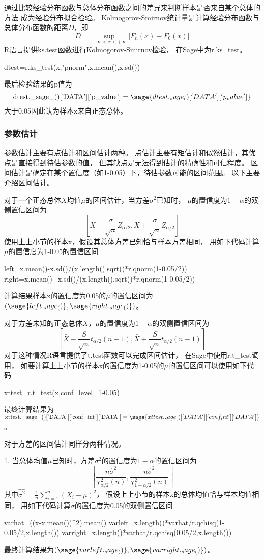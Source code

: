 通过比较经验分布函数与总体分布函数之间的差异来判断样本是否来自某个总体的方法
成为经验分布拟合检验。
Kolmogorov-Smirnov统计量是计算经验分布函数与总体分布函数的距离$D$，即
\[D=\sup_{-\infty<x<+\infty} \left| F_n(x)-F_0(x) \right|\]
R语言提供ks.test函数进行Kolmogorov-Smirnov检验，
在Sage中为r.ks\_test。
\begin{sageblock}
dtest=r.ks_test(x,"pnorm",x.mean(),x.sd())
\end{sageblock}
最后检验结果的p值为
\[\textrm{dtest.\_sage\_()['DATA']['p\_value']}=\sage{dtest._sage_()['DATA']['p_value']}\]
大于0.05因此认为样本x来自正态总体。

\subsubsection{参数估计}
参数估计主要有点估计和区间估计两种。
点估计主要有矩估计和似然估计，其优点是直接得到待估参数的值，
但其缺点是无法得到估计的精确性和可信程度。
区间估计是确定在某个置信度（如1-0.05）下，待估参数可能的区间范围。
以下主要介绍区间估计。

对于一个正态总体$X$均值$\mu$的区间估计，当方差$\sigma^2$已知时，
$\mu$的置信度为$1-\alpha$的双侧置信区间为
\[\left[ \bar{X}-\frac{\sigma}{\sqrt{n}}Z_{\alpha/2},\bar{X}+\frac{\sigma}{\sqrt{n}}Z_{\alpha/2} \right]\]
使用上上小节的样本x，假设其总体方差已知恰与样本方差相同，
用如下代码计算$\mu$的置信度为1-0.05的置信区间
\begin{sageblock}
left=x.mean()-x.sd()/(x.length().sqrt()*r.qnorm(1-0.05/2))
right=x.mean()+x.sd()/(x.length().sqrt()*r.qnorm(1-0.05/2))
\end{sageblock}
计算结果样本x的置信度为0.05的$\mu$的置信区间为$(\sage{left._sage_()},\sage{right._sage_()})$。

对于方差未知的正态总体$X$，$\mu$的置信度为$1-\alpha$的双侧置信区间为
\[\left[ \bar{X}-\frac{S}{\sqrt{n}}t_{\alpha/2}(n-1),\bar{X}+\frac{S}{\sqrt{n}}t_{\alpha/2}(n-1) \right]\]
对于这种情况R语言提供了t.test函数可以完成区间估计，
在Sage中使用r.t\_test调用，
如要计算上上小节的样本x的置信度为1-0.05的$\mu$的置信区间可以使用如下代码
\begin{sageblock}
xttest=r.t_test(x,conf_level=1-0.05)
\end{sageblock}
最终计算结果为$\textrm{xttest.\_sage\_()['DATA']['conf\_int']['DATA']}=\sage{xttest._sage_()['DATA']['conf_int']['DATA']}$。

对于方差的区间估计同样分两种情况。

1. 当总体均值$\mu$已知时，方差$\sigma^2$的置信度为$1-\alpha$的置信区间为
\[\left[ \frac{n\hat{\sigma}^2}{\chi_{\alpha/2}^2(n)},\frac{n\hat{\sigma}^2}{\chi_{1-\alpha/2}^2(n)} \right]\]
其中$\hat{\sigma^2}=\frac{1}{n}\sum_{i=1}^n(X_i-\mu)^2$，
假设上上小节的样本x的总体均值恰与样本均值相同，
用如下代码计算$\sigma$的置信度为0.05的双侧置信区间
\begin{sageblock}
varhat=((x-x.mean())^2).mean()
varleft=x.length()*varhat/r.qchisq(1-0.05/2,x.length())
varright=x.length()*varhat/r.qchisq(0.05/2,x.length())
\end{sageblock}
最终计算结果为$(\sage{varleft._sage_()},\sage{varright._sage_()})$。

